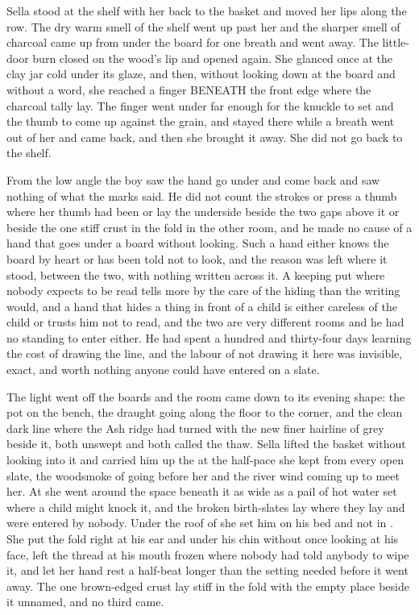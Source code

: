 Sella stood at the shelf with her back to the basket and moved her lips along the row. The dry warm smell of the shelf went up past her and the sharper smell of charcoal came up from under the board for one breath and went away. The little-door burn closed on the wood's lip and opened again. She glanced once at the clay jar cold under its glaze, and then, without looking down at the board and without a word, she reached a finger BENEATH the front edge where the charcoal tally lay. The finger went under far enough for the knuckle to set and the thumb to come up against the grain, and stayed there while a breath went out of her and came back, and then she brought it away. She did not go back to the shelf.

From the low angle the boy saw the hand go under and come back and saw nothing of what the marks said. He did not count the strokes or press a thumb where her thumb had been or lay the underside beside the two gaps above it or beside the one stiff crust in the fold in the other room, and he made no cause of a hand that goes under a board without looking. Such a hand either knows the board by heart or has been told not to look, and the reason was left where it stood, between the two, with nothing written across it. A keeping put where nobody expects to be read tells more by the care of the hiding than the writing would, and a hand that hides a thing in front of a child is either careless of the child or trusts him not to read, and the two are very different rooms and he had no standing to enter either. He had spent a hundred and thirty-four days learning the cost of drawing the line, and the labour of not drawing it here was invisible, exact, and worth nothing anyone could have entered on a slate.

\scenebreak

The light went off the boards and the room came down to its evening shape: the pot on the bench, the draught going along the floor to the corner, and the clean dark line where the Ash ridge had turned with the new finer hairline of grey beside it, both unswept and both called the thaw. Sella lifted the basket without looking into it and carried him up the  at the half-pace she kept from every open slate, the woodsmoke of  going before her and the river wind coming up to meet her. At  she went around the space beneath it as wide as a pail of hot water set where a child might knock it, and the broken birth-slates lay where they lay and were entered by nobody. Under the roof of  she set him on his bed and not in . She put the fold right at his ear and under his chin without once looking at his face, left the thread at his mouth frozen where nobody had told anybody to wipe it, and let her hand rest a half-beat longer than the setting needed before it went away. The one brown-edged crust lay stiff in the fold with the empty place beside it unnamed, and no third came.

